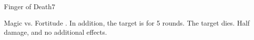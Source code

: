 \begin{spellsection}{Finger of Death}{7}
    \begin{spellheader}
    \end{spellheader}
    \begin{spellcontent}
        \begin{spelltargetinginfo}
        \end{spelltargetinginfo}
        \begin{spelleffects}
            \begin{spellattack}{Magic vs. Fortitude}
                \spellsuccess {}. In addition, the target is \staggered for 5 rounds.
                \spellcritical The target dies.
                \spellfailure Half damage, and no additional effects.
            \end{spellattack}
        \end{spelleffects}
    \end{spellcontent}
    \begin{spellfooter}
        \miscastrandom
    \end{spellfooter}
\end{spellsection}

